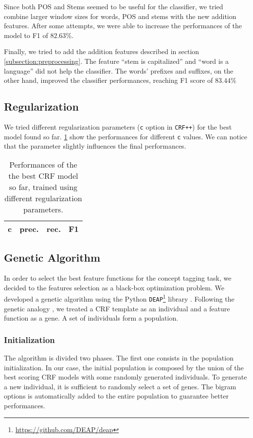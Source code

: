 Since both POS and Stems seemed to be useful for the classifier, we tried combine larger window sizes for words, \ac{POS} and stems with the new addition features.
After some attempts, we were able to increase the performances of the model to F1 of $82.63\%$.

Finally, we tried to add the addition features described in section \cref{subsection:preprocessing}.
The feature ``stem is capitalized'' and ``word is a language'' did not help the classifier.
The words' prefixes and suffixes, on the other hand, improved the classifier performances, reaching F1 score of $83.44\%$

\subsection{Regularization}
We tried different regularization parameters (\texttt{c} option in \texttt{CRF++}) for the best model found so far.
\cref{tab:regularization} show the performances for different \texttt{c} values.
We can notice that the parameter slightly influences the final performances.

\begin{table}[h]
	\centering
    \begin{tabular}{ c c c c }
    	\toprule
    		\multicolumn{1}{c}{c} & \multicolumn{1}{c}{prec.} & \multicolumn{1}{c}{rec.} & \multicolumn{1}{c}{F1} \\
    	\midrule
            
    	\bottomrule
	\end{tabular}
    \caption{Performances of the the best \ac{CRF} model so far, trained using different regularization parameters.}
	\label{tab:regularization}
\end{table}

\subsection{Genetic Algorithm}
\label{subsection:genetic}
In order to select the best feature functions for the concept tagging task, we decided to the features selection as a black-box optimization problem.
We developed a genetic algorithm using the Python \texttt{DEAP}\footnote{\url{https://github.com/DEAP/deap}} library \cite{deap}.
Following the genetic analogy \cite{lion}, we treated a \ac{CRF} template as an individual and a feature function as a gene.
A set of individuals form a population.

\subsubsection{Initialization}
The algorithm is divided two phases.
The first one consists in the population initialization.
In our case, the initial population is composed by the union of the best scoring \ac{CRF} models with some randomly generated individuals.
To generate a new individual, it is sufficient to randomly select a set of genes.
The bigram options is automatically added to the entire population to guarantee better performances.

